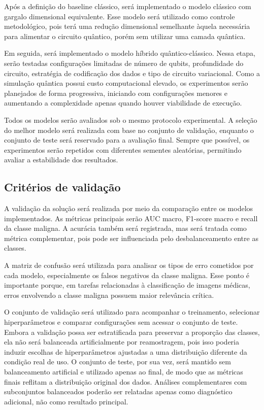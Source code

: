 \documentclass[
    12pt,
    openright,
    oneside,
    a4paper,
    english,
    brazil
]{abntex2}
\begin{document}
Após a definição do baseline clássico, será implementado o modelo clássico com gargalo dimensional equivalente. Esse modelo será utilizado como controle metodológico, pois terá uma redução dimensional semelhante àquela necessária para alimentar o circuito quântico, porém sem utilizar uma camada quântica.

Em seguida, será implementado o modelo híbrido quântico-clássico. Nessa etapa, serão testadas configurações limitadas de número de qubits, profundidade do circuito, estratégia de codificação dos dados e tipo de circuito variacional. Como a simulação quântica possui custo computacional elevado, os experimentos serão planejados de forma progressiva, iniciando com configurações menores e aumentando a complexidade apenas quando houver viabilidade de execução.

Todos os modelos serão avaliados sob o mesmo protocolo experimental. A seleção do melhor modelo será realizada com base no conjunto de validação, enquanto o conjunto de teste será reservado para a avaliação final. Sempre que possível, os experimentos serão repetidos com diferentes sementes aleatórias, permitindo avaliar a estabilidade dos resultados.

\subsection{Critérios de validação}
\label{subsec:criterios_validacao}

A validação da solução será realizada por meio da comparação entre os modelos implementados. As métricas principais serão AUC macro, F1-score macro e recall da classe maligna. A acurácia também será registrada, mas será tratada como métrica complementar, pois pode ser influenciada pelo desbalanceamento entre as classes.

A matriz de confusão será utilizada para analisar os tipos de erro cometidos por cada modelo, especialmente os falsos negativos da classe maligna. Esse ponto é importante porque, em tarefas relacionadas à classificação de imagens médicas, erros envolvendo a classe maligna possuem maior relevância crítica.

O conjunto de validação será utilizado para acompanhar o treinamento, selecionar hiperparâmetros e comparar configurações sem acessar o conjunto de teste. Embora a validação possa ser estratificada para preservar a proporção das classes, ela não será balanceada artificialmente por reamostragem, pois isso poderia induzir escolhas de hiperparâmetros ajustadas a uma distribuição diferente da condição real de uso. O conjunto de teste, por sua vez, será mantido sem balanceamento artificial e utilizado apenas ao final, de modo que as métricas finais reflitam a distribuição original dos dados. Análises complementares com subconjuntos balanceados poderão ser relatadas apenas como diagnóstico adicional, não como resultado principal.
\end{document}

